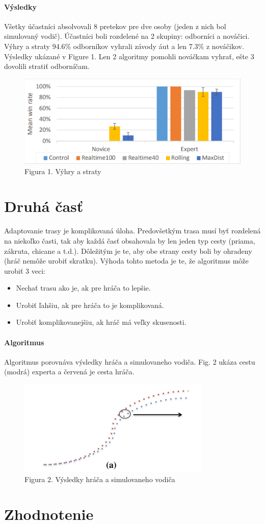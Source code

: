 \documentclass[10pt,twoside,slovak,a4paper]{article}
\begin{document}
\paragraph{Výsledky}
Všetky účastníci absolvovali 8 pretekov pre dve osoby (jeden z nich bol simulovaný vodič). Účastníci boli rozdelené na 2 skupiny: odborníci a nováčici.
Výhry a straty
94.6\% odborníkov vyhrali závody áut a len 7.3\% z nováčikov.  Výsledky ukázané v Figure 1. Len 2 algoritmy pomohli nováčkam vyhrať, ešte 3 dovolili stratiť odborníčam. 
\begin{figure}[tbh]
\centering
\includegraphics[scale=0.7]{figure1.png}
\caption{Figura 1. Výhry a straty}
\end{figure}

\section{Druhá časť} \label{druha časť}

Adaptovanie trasy je komplikovaná úloha. Predovšetkým trasa musí byť rozdelená na niekoľko časti, tak aby každá časť obsahovala by len jeden typ cesty (priama, zákruta, chicane a t.d.). Dôležitým je te, aby obe strany cesty boli by ohradeny (hráč nemôže urobiť skratku). Výhoda tohto metoda je te, že algoritmus môže  urobiť 3 veci:
\begin{itemize}
\item Nechať trasu ako je, ak pre hráča to lepšie.
\item Urobiť ľahšiu, ak pre hráča to je komplikovaná.
\item Urobiť komplikovanejšiu, ak hráč má veľky skusenosti.
\end{itemize}
\paragraph{Algoritmus}
Algoritmus porovnáva výsledky hráča a simulovaneho vodiča. Fig. 2 ukáza cestu (modrá) experta a červená je cesta hráča. 
\begin{figure}[tbh]
\centering
\includegraphics[scale=1.0]{figure2.png}
\caption{Figura 2. Výsledky hráča a simulovaneho vodiča}
\end{figure}
\section{Zhodnotenie}


\end{document}

